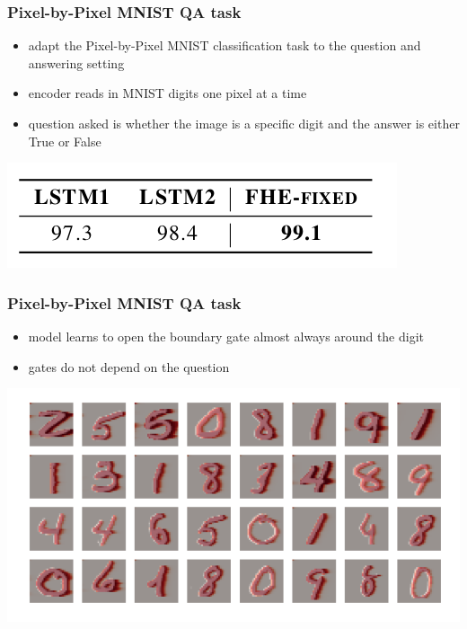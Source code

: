 \documentclass{beamer}
\begin{document}
\begin{frame}
    \frametitle{Pixel-by-Pixel MNIST QA task}
    \begin{itemize}
        \item adapt the Pixel-by-Pixel MNIST classification task to the question and answering setting
        \item encoder reads in MNIST digits one pixel at a time
        \item question asked is whether the image is a specific digit and the answer is either True or False
    \end{itemize}

    \begin{center}
        \includegraphics[scale=1.8]{img/digits-table.png}
    \end{center}
\end{frame}

\begin{frame}
    \frametitle{Pixel-by-Pixel MNIST QA task}
    \begin{itemize}
        \item model learns to open the boundary gate almost always around the digit
        \item gates do not depend on the question
    \end{itemize}

    \begin{center}
        \includegraphics[scale=1.6]{img/digits.png}
    \end{center}
\end{frame}
\end{document}
